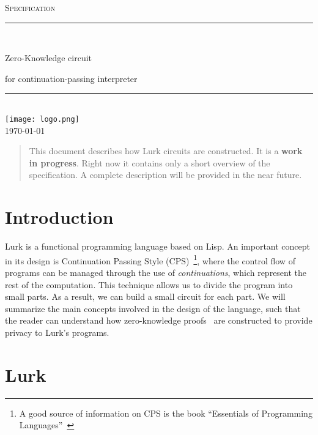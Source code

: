 \documentclass[10pt, english]{article}
\begin{document}
\begin{titlepage}
	\newcommand{\HRule}{\rule{\linewidth}{0.5mm}}

	\clearpage\thispagestyle{empty}
	\centering
	\vspace{1cm}

	\textsc{\Large Specification}\\[.5cm]
	\HRule\\[.5cm]
	{\Huge Zero-Knowledge circuit \par}
	\vspace{.5cm}
	{\Large for continuation-passing interpreter \par}
	\vspace{.5cm}
	\HRule \\[.5cm]


\texttt{[image: logo.png]}\\[.1cm]
	{\large \today}\\[2cm]
\vfill
\end{titlepage}


\begin{abstract}
  This document describes how Lurk circuits are constructed. It is a \textbf{work in progress}.
  Right now it contains only a short overview of the specification. A complete description will be provided in the near future.
\end{abstract}

\tableofcontents

\newpage

\section{Introduction}

Lurk is a functional programming language based on Lisp. An important concept in its design is Continuation Passing Style (CPS)~\footnote{A good source of information on CPS is the book ``Essentials of Programming Languages''~\cite{FWbook}}, where the control flow of programs can be managed through the use of \textit{continuations}, which represent the rest of the computation. This technique allows us to divide the program into small parts. As a result, we can build a small circuit for each part. We will summarize the main concepts involved in the design of the language, such that the reader can understand how zero-knowledge proofs~\cite{groth16, nova, halo2} are constructed to provide privacy to Lurk's programs.

\section{Lurk}
\end{document}
